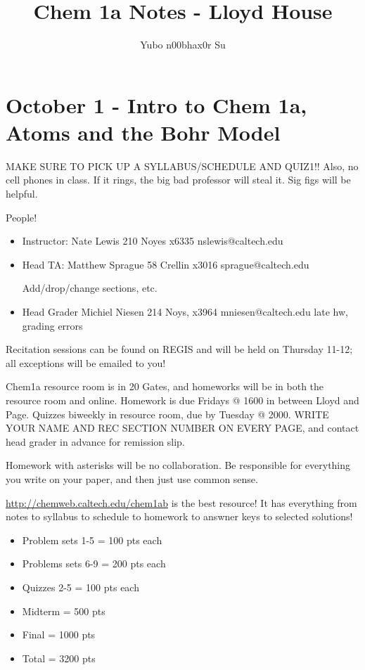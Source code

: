 \documentclass{report}
\begin{document}
\title{Chem 1a Notes - Lloyd House}
\author{Yubo n00bhax0r Su}
\date{ }
	
\maketitle

\tableofcontents

\chapter{October 1 - Intro to Chem 1a, Atoms and the Bohr Model}
MAKE SURE TO PICK UP A SYLLABUS/SCHEDULE AND QUIZ1!! Also, no cell phones in class. If it rings, the big bad professor will steal it. Sig figs will be helpful.

People!
\begin{itemize}
\item Instructor: Nate Lewis 210 Noyes x6335 nslewis@caltech.edu
\item Head TA: Matthew Sprague 58 Crellin x3016 sprague@caltech.edu 

Add/drop/change sections, etc.
\item Head Grader Michiel Niesen 214 Noys, x3964 mniesen@caltech.edu late hw, grading errors
\end{itemize}

Recitation sessions can be found on REGIS and will be held on Thursday 11-12; all exceptions will be emailed to you!

Chem1a resource room is in 20 Gates, and homeworks will be in both the resource room and online. Homework is due Fridays @ 1600 in between Lloyd and Page. Quizzes biweekly in resource room, due by Tuesday @ 2000. WRITE YOUR NAME AND REC SECTION NUMBER ON EVERY PAGE, and contact head grader in advance for remission slip.

Homework with asterisks will be no collaboration. Be responsible for everything you write on your paper, and then just use common sense.

\url{http://chemweb.caltech.edu/chem1ab} is the best resource! It has everything from notes to syllabus to schedule to homework to answner keys to selected solutions!

\begin{itemize}
\item Problem sets 1-5 = 100 pts each
\item Problems sets 6-9 = 200 pts each
\item Quizzes 2-5 = 100 pts each
\item Midterm = 500 pts
\item Final = 1000 pts
\item Total = 3200 pts
\end{itemize}
\end{document}
